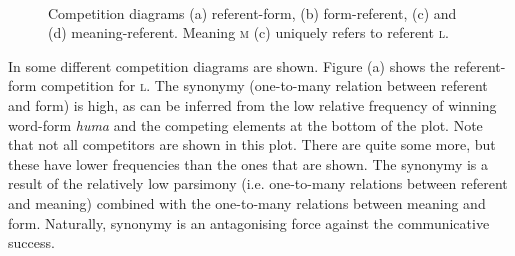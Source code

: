 \begin{figure}[t]
\centering
{}
\\
\caption{Competition diagrams (a) referent-form, (b) form-referent, (c) and (d) meaning-referent. Meaning {\scshape m} (c) uniquely refers to referent {\scshape l}.}
\label{f:st:comp}
\end{figure}

\enlargethispage{1\baselineskip}In  some different competition diagrams are shown. Figure (a) shows the referent-form competition for {\scshape l}. The synonymy (one-to-many relation between referent and form) is high, as can be inferred from the low relative frequency of winning word-form {\it huma} and the competing elements at the bottom of the plot. Note that not all competitors are shown in this plot. There are quite some more, but these have lower frequencies than the ones that are shown. The synonymy is a result of the relatively low parsimony (i.e. one-to-many relations between referent and meaning) combined with the one-to-many relations between meaning and form. Naturally, synonymy is an antagonising force against the communicative success.

